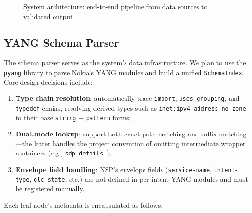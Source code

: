 \documentclass[12pt, a4paper]{article}
\newcommand{\yang}{\textsc{YANG}}
\newcommand{\nsp}{\textsc{NSP}}
\begin{document}
\begin{figure}[H]
\caption{System architecture: end-to-end pipeline from data sources to validated output}
\label{fig:pipeline}
\end{figure}

\subsection{YANG Schema Parser}
\label{sec:yang-parser}

The schema parser serves as the system's data infrastructure. We plan to use the \texttt{pyang} library to parse Nokia's \yang{} modules and build a unified \texttt{SchemaIndex}. Core design decisions include:

\begin{enumerate}
  \item \textbf{Type chain resolution}: automatically trace \texttt{import}, \texttt{uses grouping}, and \texttt{typedef} chains, resolving derived types such as \texttt{inet:ipv4-address-no-zone} to their base \texttt{string} + \texttt{pattern} forms;
  \item \textbf{Dual-mode lookup}: support both exact path matching and suffix matching---the latter handles the project convention of omitting intermediate wrapper containers (e.g., \texttt{sdp-details.});
  \item \textbf{Envelope field handling}: \nsp{}'s envelope fields (\texttt{service-name}, \texttt{intent-type}, \texttt{olc-state}, etc.) are not defined in per-intent \yang{} modules and must be registered manually.
\end{enumerate}

\noindent
Each leaf node's metadata is encapsulated as follows:
\end{document}
